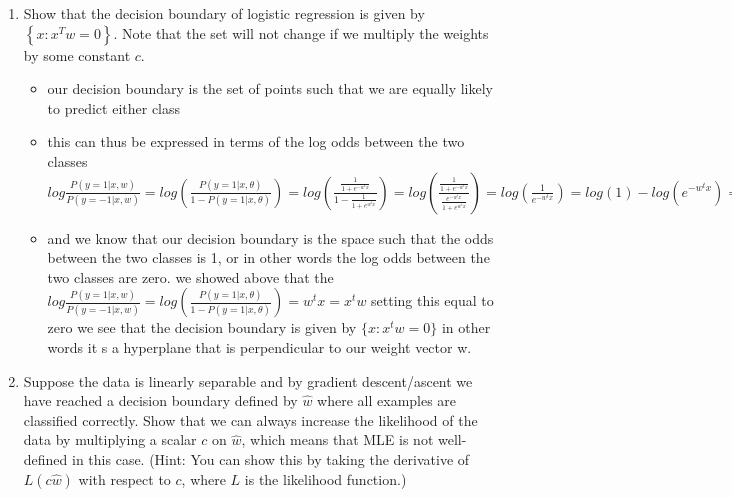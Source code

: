 \documentclass{article}
\theoremstyle{plain}
\theoremstyle{definition}
\begin{document}
\begin{enumerate}
  \setcounter{enumi}{\value{saveenum}}
\item Show that the decision boundary of logistic regression is given by $\left\{x\colon x^Tw=0\right\}$.
Note that the set will not change if we multiply the weights by some constant $c$.
\begin{itemize}
    \color{blue}
    \item our decision boundary is the set of points such that we are equally likely to predict either class 
    \item this can thus be expressed in terms of the log odds between the two classes $log\frac{P(y=1|x,w)}{P(y=-1|x,w)}=log(\frac{P(y=1|x,\theta)}{1-P(y=1|x,\theta)})=log(\frac{\frac{1}{1+e^{-w^tx}}} {1-\frac{1}{1+e^{w^tx}}})=log(\frac{\frac{1}{1+e^{-w^tx}}} {\frac{e^{-w^tx}}{1+e^{w^tx}}})=log(\frac{1}{e^{-w^tx}})=log(1)-log(e^{-w^tx})=0-(-w^txlog(e))=w^tx$
    \item and we know that our decision boundary is the space such that the odds between the two classes is 1, or in other words the log odds between the two classes are zero. we showed above that the $log\frac{P(y=1|x,w)}{P(y=-1|x,w)}=log(\frac{P(y=1|x,\theta)}{1-P(y=1|x,\theta)})=w^tx=x^tw$ setting this equal to zero we see that the decision boundary is given by $\{x:x^tw=0\}$ in other words it s a hyperplane that is perpendicular to our weight vector w.  
    
\end{itemize}

\item Suppose the data is linearly separable and by gradient descent/ascent we have reached a decision boundary defined by $\hat{w}$ where all examples are classified correctly. 
Show that we can always increase the likelihood of the data by multiplying a scalar $c$ on $\hat{w}$,
which means that MLE is not well-defined in this case.
{(Hint: You can show this by taking the derivative of $L(c\hat{w})$ with respect to $c$, where $L$ is the likelihood function.)}
\begin{itemize}


\end{itemize}
\end{enumerate}
\end{document}
